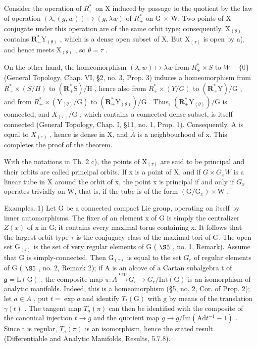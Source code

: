 Consider the operation of \(R_{+}^{*}\) on X induced by passage to the quotient by the law of operation \((\lambda, (g, w)) \mapsto (g, \lambda w)\) of \(R_{+}^{*}\) on G × W. Two points of X conjugate under this operation are of the same orbit type; consequently, \(\mathrm{X}_{(\theta)}\) contains \(\mathbf{R}_{+}^{*}\mathrm{Y}_{(\theta)}\) , which is a dense open subset of X. But \(\mathrm{X}_{(\tau)}\) is open by a), and hence meets \(\mathrm{X}_{(\theta)}\) , so \(\theta = \tau\) .

On the other hand, the homeomorphism \((\lambda,w)\mapsto\lambda w\) from \(R_{+}^{*}\times S\) to \(W-\{0\}\) (General Topology, Chap. VI, §2, no. 3, Prop. 3) induces a homeomorphism from \(R_{+}^{*}\times(S/H)\) to \((\mathbf{R}_{+}^{*}\mathrm{S})/\mathrm{H}\) , hence also from \(R_{+}^{*}\times(Y/G)\) to \((\mathbf{R}_{+}^{*}\mathrm{Y})/\mathrm{G}\) , and from \(R_{+}^{*}\times(\mathrm{Y}_{(\theta)}/\mathrm{G})\) to \((\mathbf{R}_{+}^{*}\mathrm{Y}_{(\theta)})/\mathrm{G}\) . Thus, \((\mathbf{R}_{+}^{*}\mathrm{Y}_{(\theta)})/\mathrm{G}\) is connected, and \(X_{(\tau)}/\mathrm{G}\) , which contains a connected dense subset, is itself connected (General Topology, Chap. I, §11, no. 1, Prop. 1). Consequently, A is equal to \(X_{(\tau)}\) , hence is dense in X, and \(\overline{A}\) is a neighbourhood of x. This completes the proof of the theorem.

With the notations in Th. 2 c), the points of \(\mathrm{X}_{(\tau)}\) are said to be principal and their orbits are called principal orbits. If x is a point of X, and if \(G \times G_{x}W\) is a linear tube in X around the orbit of x, the point x is principal if and only if \(G_{x}\) operates trivially on W, that is, if the tube is of the form \((\mathrm{G}/\mathrm{G}_{x}) \times \mathrm{W}\) .

Examples. 1) Let G be a connected compact Lie group, operating on itself by inner automorphisms. The fixer of an element x of G is simply the centralizer \(Z(x)\) of x in G; it contains every maximal torus containing x. It follows that the largest orbit type \(\tau\) is the conjugacy class of the maximal tori of G. The open set \(\mathrm{G}_{(\tau)}\) is the set of very regular elements of G ( \(\S5\) , no. 1, Remark). Assume that G is simply-connected. Then \(\mathrm{G}_{(\tau)}\) is equal to the set \(G_{r}\) of regular elements of G ( \(\S5\) , no. 2, Remark 2); if A is an alcove of a Cartan subalgebra t of \(\mathfrak{g} = \mathrm{L}(\mathrm{G})\) , the composite map \(\pi: A \xrightarrow{\exp} G_{r} \longrightarrow G_{r}/\mathrm{Int}(\mathrm{G})\) is an isomorphism of analytic manifolds. Indeed, this is a homeomorphism (§5, no. 2, Cor. of Prop. 2); let \(a \in A\) , put \(t = \exp a\) and identify \(T_{t}(\mathrm{G})\) with g by means of the translation \(\gamma(t)\) . The tangent map \(T_{a}(\pi)\) can then be identified with the composite of the canonical injection \(t \to g\) and the quotient map \(g \to g/\mathrm{Im}(\mathrm{Ad} t^{-1} - 1)\) . Since t is regular, \(T_{a}(\pi)\) is an isomorphism, hence the stated result (Differentiable and Analytic Manifolds, Results, 5.7.8).

